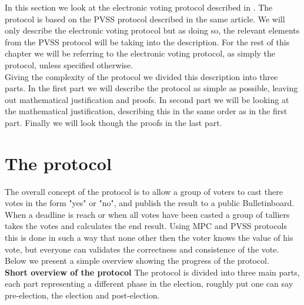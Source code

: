 In this section we look at the electronic voting protocol described in \cite{Schoenmakers1999}. The protocol is based on the PVSS protocol described in the same article. We will only describe the electronic voting protocol but as doing so, the relevant elements from the PVSS protocol will be taking into the description. For the rest of this chapter we will be referring to the electronic voting protocol, as simply the protocol, unless specified otherwise. \\

\noindent
Giving the complexity of the protocol we divided this description into three parts. In the first part we will describe the protocol as simple as possible, leaving out mathematical justification and proofs. In second part we will be looking at the mathematical justification, describing this in the same order as in the first part. Finally we will look though the proofs in the last part. 


\section{The protocol}   \label{sec:the_protocol}


\noindent
The overall concept of the protocol is to allow a group of voters to cast there votes in the form "yes" or "no", and publish the result to a public Bulletinboard. When a deadline is reach or when all votes have been casted a group of talliers takes the votes and calculates the end result. 
Using MPC and PVSS protocols this is done in such a way that none other then the voter knows the value of his vote, but everyone can validates the correctness and consistence of the vote. Below we present a simple overview showing the progress of the protocol. \\

\noindent
\textbf{Short overview of the protocol}
The protocol is divided into three main parts, each part representing a different phase in the election, roughly put one can say pre-election, the election and post-election. 

